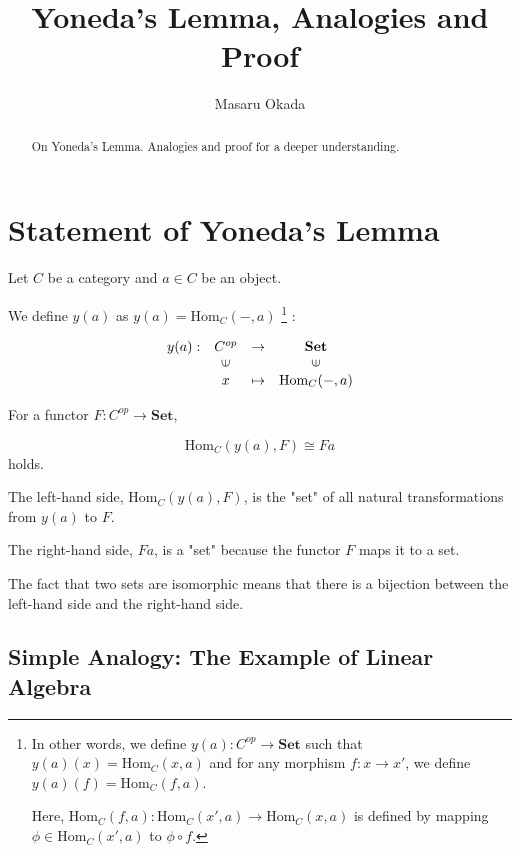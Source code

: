 \documentclass[uplatex,a4j,12pt,dvipdfmx]{jsarticle}
\title{
Yoneda's Lemma, Analogies and Proof
}
\author{
Masaru Okada
}
\begin{document}
\maketitle

\begin{abstract}
	On Yoneda's Lemma. Analogies and proof for a deeper understanding.
\end{abstract}

\section{Statement of Yoneda's Lemma}

Let $C$ be a category and $a \in C$ be an object.

We define $y(a)$ as $y(a) = \text{Hom}_{C}(-,a)$
\footnote{
	In other words, we define $y(a) : C^{op} \to \textbf{Set}$ such that $y(a)(x) = \text{Hom}_{C}(x,a)$ and for any morphism $f: x \to x'$, we define $y(a)(f) = \text{Hom}_{C}(f,a)$.

	Here, $\text{Hom}_{C}(f,a): \text{Hom}_{C}(x',a) \to \text{Hom}_{C}(x,a)$ is defined by mapping $\phi \in \text{Hom}_{C}(x',a)$ to $\phi \circ f$.
}
:

\[
	\begin{array}{cccc}
		y(a) : & C^{op}                  & \to     & \textbf{Set}            \\
		       & \rotatebox{90}{${\in}$} &         & \rotatebox{90}{${\in}$} \\
		       & x                       & \mapsto & \text{Hom}_{C}(-,a)
	\end{array}
\]


For a functor $F: C^{op} \to \textbf{Set}$,

\[
	\text{Hom}_{C}(y(a),F) \cong Fa
\]
holds.

The left-hand side,
$\text{Hom}_{C}(y(a),F)$,
is the "set" of all natural transformations from $y(a)$ to $F$.

The right-hand side, $Fa$, is a "set" because the functor $F$ maps it to a set.

The fact that two sets are isomorphic means that there is a bijection between the left-hand side and the right-hand side.



\subsection{Simple Analogy: The Example of Linear Algebra}
\end{document}
